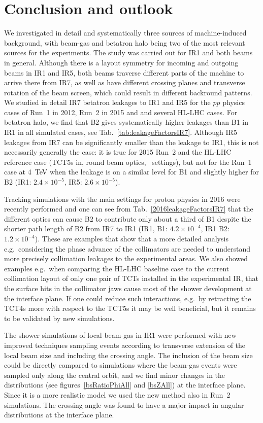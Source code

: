 \section{Conclusion and outlook~\label{last}}

We investigated in detail and systematically three sources of machine-induced background, with beam-gas and betatron halo being two of the most relevant sources for the experiments. The study was carried out for IR1 and both beams in general. Although there is a layout symmetry for incoming and outgoing beams in IR1 and IR5, both beams traverse different parts of the machine to arrive there from IR7, as well as have different crossing planes and transverse rotation of the beam screen, which could result in different backround patterns. We studied in detail IR7 betatron leakages to IR1 and IR5 for the $pp$ physics cases of Run~1 in 2012, Run~2 in 2015 and and several HL-LHC cases. For betatron halo, we find that B2 gives systematically higher leakages than B1 in IR1 in all simulated cases, see Tab.~\ref{tab:leakageFactorsIR7}. Although IR5 leakages from IR7 can be significantly smaller than the leakage to IR1, this is not necessarily generally the case: it is true for 2015 Run~2 and the HL-LHC reference case (TCT5s in, round beam optics, \twosigmaret~settings), but not for the Run~1 case at 4~TeV when the leakage is on a similar level for B1 and slightly higher for B2 (IR1: $2.4 \times 10^{-5}$, IR5: $2.6 \times 10^{-5}$).

Tracking simulations with the main settings for proton physics in 2016 were recently performed and one can see from Tab.~\ref{2016leakageFactorsIR7} that the different optics can cause B2 to contribute only about a third of B1 despite the shorter path length of B2 from IR7 to IR1 (IR1, B1: $4.2 \times 10^{-4}$, IR1 B2:$1.2 \times 10^{-4}$). These are examples that show that a more detailed analysis e.g.~considering the phase advance of the collimators are needed to understand more precisely collimation leakages to the experimental areas. We also showed examples e.g.~when comparing the HL-LHC baseline case to the current collimation layout of only one pair of TCTs installed in the experimental IR, that the surface hits in the collimator jaws cause most of the shower development at the interface plane. If one could reduce such interactions, e.g.~by retracting the TCT4s more with respect to the TCT5s it may be well beneficial, but it remains to be validated by new simulations.

The shower simulations of local beam-gas in IR1 were performed with new improved techniques sampling events according to transverse extension of the local beam size and including the crossing angle. The inclusion of the beam size could be directly compared to simulations where the beam-gas events were sampled only along the central orbit, and we find minor changes in the distributions (see figures~\ref{bsRatioPhiAll} and \ref{bsZAll}) at the interface plane. Since it is a more realistic model we used the new method also in Run~2 simulations. The crossing angle was found to have a major impact in angular distributions at the interface plane.

